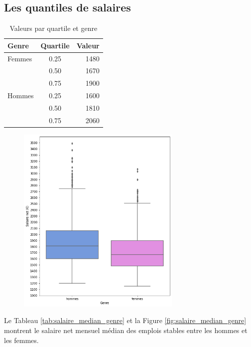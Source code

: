 \documentclass[12pt, a4paper, titlepage, table]{article}
\begin{document}
	\subsection{Les quantiles de salaires}	
		\begin{table}[H]
			\centering
			\begin{tabular}{lcr}
				\toprule
				\textbf{Genre} & \textbf{Quartile} & \textbf{Valeur} \\
				\midrule
				Femmes & 0.25 & 1480 \\
				& 0.50 & 1670 \\
				& 0.75 & 1900 \\
				\midrule
				Hommes & 0.25 & 1600 \\
				& 0.50 & 1810 \\
				& 0.75 & 2060 \\
				\bottomrule
			\end{tabular}
			\caption{Valeurs par quartile et genre}
			\label{tab:quartile_values_new}
		\end{table}
		
	
	\begin{figure}[H]
		\centering
		\includegraphics[width=0.7\textwidth]{../graphs/boxplot_salaire_genre.png}
		\label{fig:boxplot_salaire_genre}
	\end{figure}
	

	Le Tableau \ref{tab:salaire_median_genre} et la Figure \ref{fig:salaire_median_genre} montrent le salaire net mensuel médian des emplois stables entre les hommes et les femmes. 
\end{document}

